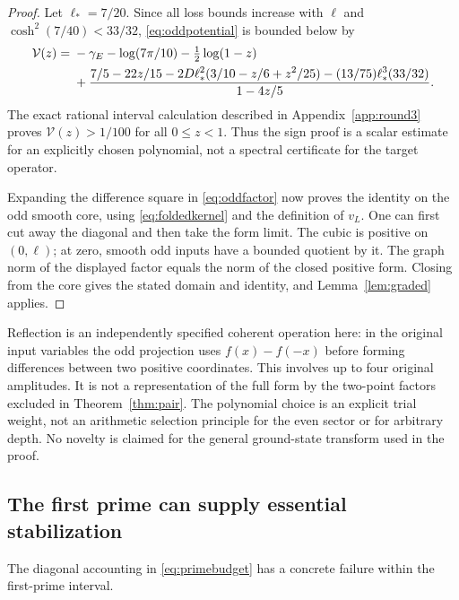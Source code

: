 \documentclass[11pt]{article}
\numberwithin{equation}{section}
\theoremstyle{definition}
\theoremstyle{remark}
\begin{document}
\begin{proof}
Let $\ell_*=7/20$. Since all loss bounds increase with $\ell$ and
$\cosh^2(7/40)<33/32$, \eqref{eq:oddpotential} is bounded below by
\begin{align}
\mathcal V(z)={}&-\gamma_E-\log(7\pi/10)-\tfrac12\log(1-z)\notag\\
&+\frac{\displaystyle 7/5-22z/15
-2D\ell_*^2(3/10-z/6+z^2/25)
-(13/75)\ell_*^3(33/32)}{1-4z/5}.
\label{eq:oddscalar}
\end{align}
The exact rational interval calculation described in
Appendix~\ref{app:round3} proves $\mathcal V(z)>1/100$ for all
$0\leq z<1$. Thus the sign proof is a scalar estimate for an explicitly
chosen polynomial, not a spectral certificate for the target operator.

Expanding the difference square in \eqref{eq:oddfactor} now proves the
identity on the odd smooth core, using \eqref{eq:foldedkernel} and the
definition of $v_L$. One can first cut away the diagonal and then take the
form limit. The cubic is positive on $(0,\ell)$; at zero, smooth odd
inputs have a bounded quotient by it. The graph norm of the displayed
factor equals the norm of the closed positive form. Closing from the
core gives the stated domain and identity, and Lemma~\ref{lem:graded}
applies.
\end{proof}

Reflection is an independently specified coherent operation here: in the
original input variables the odd projection uses $f(x)-f(-x)$ before
forming differences between two positive coordinates. This involves up to
four original amplitudes. It is not a representation of the full form by
the two-point factors excluded in Theorem~\ref{thm:pair}. The polynomial
choice is an explicit trial weight, not an arithmetic selection principle
for the even sector or for arbitrary depth. No novelty is claimed for the
general ground-state transform used in the proof.

\subsection{The first prime can supply essential stabilization}

The diagonal accounting in \eqref{eq:primebudget} has a concrete failure
within the first-prime interval.
\end{document}
